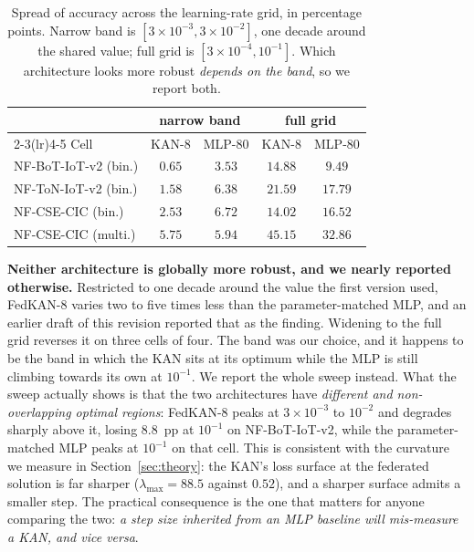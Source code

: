 \begin{table}[t]
\caption{Spread of accuracy across the learning-rate grid, in percentage points. Narrow band is
$[3\!\times\!10^{-3},3\!\times\!10^{-2}]$, one decade around the shared value; full grid is
$[3\!\times\!10^{-4},10^{-1}]$. Which architecture looks more robust \emph{depends on the band},
so we report both.}
\label{tab:lrrobust}
\centering
\footnotesize
\begin{tabular}{@{}lcccc@{}}
\toprule
& \multicolumn{2}{c}{narrow band} & \multicolumn{2}{c}{full grid} \\
\cmidrule(lr){2-3}\cmidrule(lr){4-5}
Cell & KAN-8 & MLP-80 & KAN-8 & MLP-80 \\
\midrule
NF-BoT-IoT-v2 (bin.) & $0.65$ & $3.53$ & $14.88$ & $9.49$ \\
NF-ToN-IoT-v2 (bin.) & $1.58$ & $6.38$ & $21.59$ & $17.79$ \\
NF-CSE-CIC (bin.)    & $2.53$ & $6.72$ & $14.02$ & $16.52$ \\
NF-CSE-CIC (multi.)  & $5.75$ & $5.94$ & $45.15$ & $32.86$ \\
\bottomrule
\end{tabular}
\end{table}

\textbf{Neither architecture is globally more robust, and we nearly reported otherwise.}
Restricted to one decade around the value the first version used, FedKAN-8 varies two to five
times less than the parameter-matched MLP, and an earlier draft of this revision reported that
as the finding. Widening to the full grid reverses it on three cells of four. The band was our
choice, and it happens to be the band in which the KAN sits at its optimum while the MLP is
still climbing towards its own at $10^{-1}$. We report the whole sweep instead. What the sweep
actually shows is that the two architectures have \emph{different and non-overlapping optimal
regions}: FedKAN-8 peaks at $3\!\times\!10^{-3}$ to $10^{-2}$ and degrades sharply above it,
losing $8.8$~pp at $10^{-1}$ on NF-BoT-IoT-v2, while the parameter-matched MLP peaks at
$10^{-1}$ on that cell. This is consistent with the curvature we measure in
Section~\ref{sec:theory}: the KAN's loss surface at the federated solution is far sharper
($\lambda_{\max}=88.5$ against $0.52$), and a sharper surface admits a smaller step. The
practical consequence is the one that matters for anyone comparing the two: \emph{a step size
inherited from an MLP baseline will mis-measure a KAN, and vice versa}.

